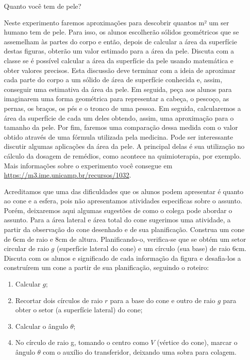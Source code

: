\begin{sugestions}{Quanto você tem de pele?}
{

Neste experimento faremos aproximações para descobrir quantos m² um ser humano tem de pele. Para isso, os alunos escolherão sólidos geométricos que se assemelham às partes do corpo e então, depois de calcular a área da superfície destas figuras, obterão um valor estimado para a área da pele. Discuta com a classe se é possível calcular a área da superfície da pele usando matemática e obter valores precisos. Esta discussão deve terminar com a ideia de aproximar cada parte do corpo a um sólido de área de superfície conhecida e, assim, conseguir uma estimativa da área da pele. Em seguida, peça aos alunos para imaginarem uma forma geométrica para representar a cabeça, o pescoço, as pernas, os braços, os pés e o tronco de uma pessoa. Em seguida, calcularemos a área da superfície de cada um deles obtendo, assim, uma aproximação para o tamanho da pele. Por fim, faremos uma comparação dessa medida com o valor obtido através de uma fórmula utilizada pela medicina. Pode ser interessante discutir algumas aplicações da área da pele. A principal delas é sua utilização no cálculo da dosagem de remédios, como acontece na quimioterapia, por exemplo. Mais informações sobre o experimento você consegue em \url{https://m3.ime.unicamp.br/recursos/1032}.

Acreditamos que uma das dificuldades que os alunos podem apresentar é quanto ao cone e a esfera, pois não apresentamos atividades especificas sobre o assunto. Porém, deixaremos aqui algumas sugestões de como o colega pode abordar o assunto. Para a área lateral e área total do cone sugerimos uma atividade, a partir da observação do cone desenhado e de sua planificação. Construa um cone de $6$cm de raio e $8$cm de altura. Planificando-o, verifica-se que se obtém um setor circular de raio $g$ (superfície lateral do cone) e um círculo (sua base) de raio $6$cm. Discuta com os alunos e significado de cada informação da figura e desafia-los a construírem um cone a partir de sua planificação, seguindo o roteiro:

\begin{enumerate}
\item Calcular $g$;
\item Recortar dois círculos de raio $r$ para a base do cone e outro de raio $g$ para obter o setor (a superfície lateral) do cone;
\item Calcular o ângulo $\theta$;
\item No círculo de raio g, tomando o centro como $V$ (vértice do cone), marcar o ângulo $\theta$ com o auxílio do transferidor, deixando uma sobra para colagem.
\begin{figure}[H]
\centering


\end{figure}
\end{enumerate}}
\end{sugestions}
